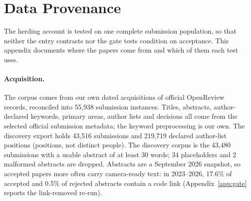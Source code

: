 
\providecommand{\Hok}{H\ensuremath{\checkmark}}
\providecommand{\Hno}{H\ensuremath{\times}}
\providecommand{\Tok}{T\ensuremath{\checkmark}}

\section{Data Provenance}\label{app:data}

The herding account is tested on one complete submission population, so that neither the entry contrasts nor the
gate tests condition on acceptance. This appendix documents where the papers come from and which of them each test
uses.

\paragraph{Acquisition.} The corpus comes from our own dated acquisitions of official OpenReview records, reconciled
into 55,938 submission instances. Titles, abstracts, author-declared keywords, primary areas, author lists and
decisions all come from the selected official submission metadata; the keyword preprocessing is our own. The
discovery export holds 43,516 submissions and 219,719 declared author-list positions (positions, not distinct
people). The discovery corpus is the 43,480 submissions with a usable abstract of at least 30 words; 34 placeholders
and 2 malformed abstracts are dropped. Abstracts are a September 2026 snapshot, so accepted papers more often carry
camera-ready text: in 2023--2026, 17.6\% of accepted and 0.5\% of rejected abstracts contain a code link
(Appendix~\ref{app:gate} reports the link-removed re-run).

